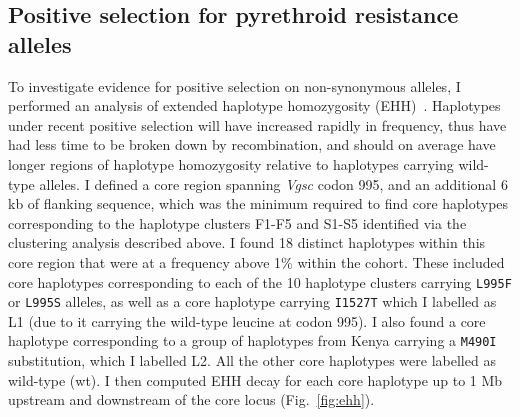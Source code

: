 \begin{refsection}
\subsection{Positive selection for pyrethroid resistance alleles}\label{subsec:results-selection}


To investigate evidence for positive selection on non-synonymous alleles, I performed an analysis of extended haplotype homozygosity (EHH)~\parencite{Sabeti2002}.
%
Haplotypes under recent positive selection will have increased rapidly in frequency, thus have had less time to be broken down by recombination, and should on average have longer regions of haplotype homozygosity relative to haplotypes carrying wild-type alleles.
%
I defined a core region spanning \textit{Vgsc} codon 995, and an additional 6 kb of flanking sequence, which was the minimum required to find core haplotypes corresponding to the haplotype clusters F1-F5 and S1-S5 identified via the clustering analysis described above.
%
I found 18 distinct haplotypes within this core region that were at a frequency above 1\% within the cohort.
%
These included core haplotypes corresponding to each of the 10 haplotype clusters carrying \texttt{L995F} or \texttt{L995S} alleles, as well as a core haplotype carrying \texttt{I1527T} which I labelled as L1 (due to it carrying the wild-type leucine at codon 995).
%
I also found a core haplotype corresponding to a group of haplotypes from Kenya carrying a \texttt{M490I} substitution, which I labelled L2.
%
All the other core haplotypes were labelled as wild-type (wt).
%
I then computed EHH decay for each core haplotype up to 1 Mb upstream and downstream of the core locus (Fig.~\ref{fig:ehh}).



\end{refsection}
